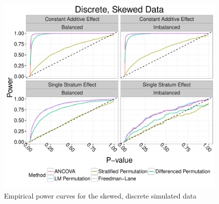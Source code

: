 \documentclass[12pt]{article}
\begin{document}
\begin{figure}
\centering
\includegraphics[width = \textwidth]{fig/skewed_simulation_power.pdf}
\caption{Empirical power curves for the skewed, discrete simulated data}
\label{fig:skewed_sim_power}
\end{figure}
\end{document}
